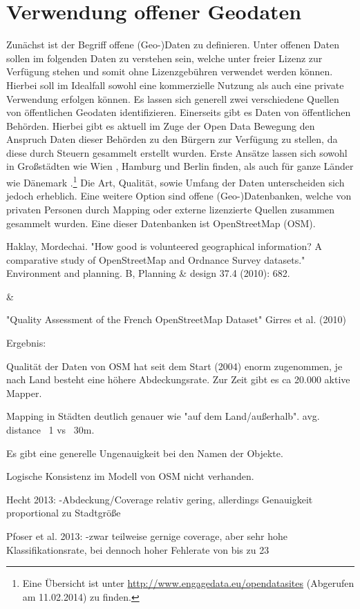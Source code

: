 \section{Verwendung offener Geodaten}
\label{subsec:S3_offeneGeodaten}

Zunächst ist der Begriff offene (Geo-)Daten zu definieren.
Unter offenen Daten sollen im folgenden Daten zu verstehen sein, welche unter freier Lizenz zur Verfügung stehen und somit ohne Lizenzgebühren verwendet werden können. Hierbei soll im Idealfall sowohl eine kommerzielle Nutzung als auch eine private Verwendung erfolgen können.
Es lassen sich generell zwei verschiedene Quellen von öffentlichen Geodaten identifizieren.
Einerseits gibt es Daten von öffentlichen Behörden. Hierbei gibt es aktuell im Zuge der Open Data Bewegung \cite{Oreilly.2007} den Anspruch Daten dieser Behörden zu den Bürgern zur Verfügung zu stellen, da diese durch Steuern gesammelt erstellt wurden. Erste Ansätze lassen sich sowohl in Großstädten wie Wien \cite{Wien.2014}, Hamburg \cite{Hamburg.2014} und Berlin \cite{Berlin.2014} finden, als auch für ganze Länder wie Dänemark \cite{Denmark.2014}.\footnote{Eine Übersicht ist unter \url{http://www.engagedata.eu/opendatasites} (Abgerufen am 11.02.2014) zu finden. } Die Art, Qualität, sowie Umfang der Daten unterscheiden sich jedoch erheblich. 
Eine weitere Option sind offene (Geo-)Datenbanken, welche von privaten Personen durch Mapping oder externe lizenzierte Quellen zusammen gesammelt wurden. Eine dieser Datenbanken ist OpenStreetMap (OSM).


Haklay, Mordechai. "How good is volunteered geographical information? A comparative study of OpenStreetMap and Ordnance Survey datasets." Environment and planning. B, Planning \& design 37.4 (2010): 682.

\&

"Quality Assessment of the French OpenStreetMap Dataset" Girres et al. (2010)

Ergebnis:

Qualität der Daten von OSM hat seit dem Start (2004) enorm zugenommen, je nach Land besteht eine höhere Abdeckungsrate. Zur Zeit gibt es ca 20.000 aktive Mapper.

Mapping in Städten deutlich genauer wie "auf dem Land/außerhalb".  avg. distance ~1 vs ~30m.

Es gibt eine generelle Ungenauigkeit bei den Namen der Objekte.

Logische Konsistenz im Modell von OSM nicht verhanden.

Hecht 2013:
-Abdeckung/Coverage relativ gering, allerdings Genauigkeit proportional zu Stadtgröße

Pfoser et al. 2013:
-zwar teilweise gernige coverage, aber sehr hohe Klassifikationsrate, bei dennoch hoher Fehlerate von bis zu 23%
